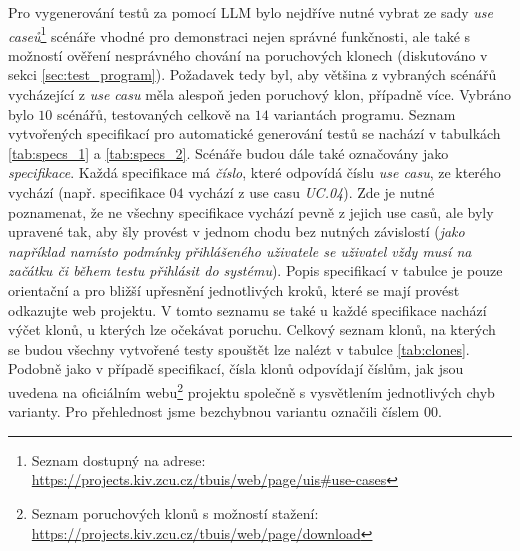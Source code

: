 \documentclass[czech, ma, kiv, he, iso690numb, pdf, viewonly]{fasthesis}
\begin{document}
    Pro vygenerování testů za pomocí LLM bylo nejdříve nutné vybrat ze sady \textit{use caseů}\footnote{Seznam dostupný na adrese: \url{https://projects.kiv.zcu.cz/tbuis/web/page/uis#use-cases}} scénáře vhodné pro demonstraci nejen správné funkčnosti, ale také s možností ověření nesprávného chování na poruchových klonech (diskutováno v sekci \ref{sec:test_program}). Požadavek tedy byl, aby většina z vybraných scénářů vycházející z \textit{use casu} měla alespoň jeden poruchový klon, případně více. Vybráno bylo \(10\) scénářů, testovaných celkově na \(14\) variantách programu. Seznam vytvořených specifikací pro automatické generování testů se nachází v tabulkách \ref{tab:specs_1} a \ref{tab:specs_2}. Scénáře budou dále také označovány jako \textit{specifikace}. Každá specifikace má \textit{číslo}, které odpovídá číslu \textit{use casu}, ze kterého vychází (např. specifikace \(04\) vychází z use casu \textit{UC.04}). Zde je nutné poznamenat, že ne všechny specifikace vychází pevně z jejich use casů, ale byly upravené tak, aby šly provést v jednom chodu bez nutných závislostí (\textit{jako například namísto podmínky přihlášeného uživatele se uživatel vždy musí na začátku či během testu přihlásit do systému}). Popis specifikací v tabulce je pouze orientační a pro bližší upřesnění jednotlivých kroků, které se mají provést odkazujte web projektu. V tomto seznamu se také u každé specifikace nachází výčet klonů, u kterých lze očekávat poruchu. Celkový seznam klonů, na kterých se budou všechny vytvořené testy spouštět lze nalézt v tabulce \ref{tab:clones}. Podobně jako v případě specifikací, čísla klonů odpovídají číslům, jak jsou uvedena na oficiálním webu\footnote{Seznam poruchových klonů s možností stažení: \url{https://projects.kiv.zcu.cz/tbuis/web/page/download}} projektu společně s vysvětlením jednotlivých chyb varianty. Pro přehlednost jsme bezchybnou variantu označili číslem \(00\).
\end{document}
